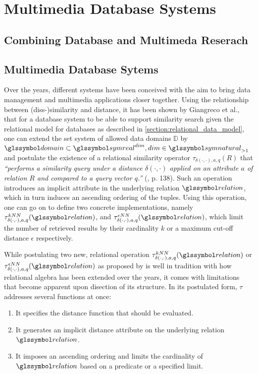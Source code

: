 \chapter{Multimedia Database Systems}
\label{chapter:theory_multimedia_database}

\section{Combining Database and Multimeda Reserach}


\section{Multimedia Database Sytems}

Over the years, different systems have been conceived with the aim to bring data management and multimedia applications closer together. Using the relationship between (diss-)similarity and distance, it has been shown by Giangreco et al., that for a database system to be able to support similarity search given the relational model for databases as described in \cref{section:relational_data_model}, one can extend the set system of allowed data domains $\mathbb{D}$ by $\domain \subset \symreal^{dim}, dim \in \symnatural_{>1}$ and postulate the existence of a relational similarity operator $\tau_{\delta(\cdot,\cdot),a,q}(R)$ that \emph{``performs a similarity query under a distance $\delta(\cdot,\cdot)$ applied on an attribute $a$ of relation $R$ and compared to a query vector $q$.''} (\cite{Giangreco:2018Database}, p. 138). Such an operation introduces an implicit attribute in the underlying relation $\relation$, which in turn induces an ascending ordering of the tuples. Using this operation, one can go on to define two concrete implementations, namely $\tau^{kNN}_{\delta(\cdot,\cdot),a,q}(\relation)$, and $\tau^{\epsilon NN}_{\delta(\cdot,\cdot),a,q}(\relation)$, which limit the number of retrieved results by their cardinality $k$ or a maximum cut-off distance $\epsilon$ respectively.

While postulating two new, relational operation $\tau^{kNN}_{\delta(\cdot,\cdot),a,q}(\relation)$ or $\tau^{\epsilon NN}_{\delta(\cdot,\cdot),a,q}(\relation)$ as proposed by \cite{Giangreco:2018Database} is well in tradition with how relational algebra has been extended over the years, it comes with limitations that become apparent upon disection of its structure. In its postulated form, $\tau$ addresses several functions at once:

\begin{enumerate}
    \item It specifies the distance function that should be evaluated.
    \item It generates an implicit distance attribute on the underlying relation $\relation$.
    \item It imposes an ascending ordering and limits the cardinality of $\relation$ based on a predicate or a specified limit.
\end{enumerate}

